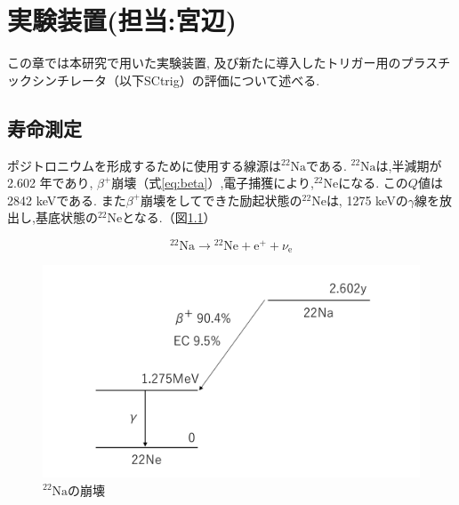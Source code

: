 \chapter{実験装置(担当:宮辺)}
\label{apparatus}


この章では本研究で用いた実験装置,
及び新たに導入したトリガー用のプラスチックシンチレータ（以下SCtrig）の評価について述べる.


\section{寿命測定}

ポジトロニウムを形成するために使用する線源は$\mathrm{^{22}Na}$である.
$\mathrm{^{22}Na}$は,半減期が2.602 年であり,
$\beta^{+}$崩壊（式\ref{eq:beta}）,電子捕獲により,$\mathrm{^{22}Ne}$になる.
この$Q$値は2842 keVである.\cite{ToRI}
また$\beta^{+}$崩壊をしてできた励起状態の$\mathrm{^{22}Ne}$は,
1275 keVの$\gamma$線を放出し,基底状態の$\mathrm{^{22}Ne}$となる.（図\ref{fig:na}）

\begin{equation}
\mathrm{^{22}Na} \to \mathrm{^{22}Ne} + \mathrm{e^{+}} + \nu_{\mathrm{e}}
\label{eq:beta}
\end{equation}

\begin{figure}[H]
\centering
\includegraphics[keepaspectratio,scale=0.4]{fig/ybm/na.pdf}
\caption{$\mathrm{^{22}Na}$の崩壊\cite{ToI}}
\label{fig:na}
\end{figure}

